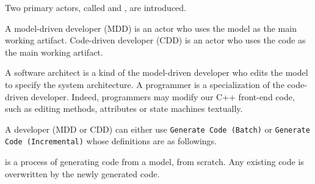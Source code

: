 Two primary actors, called 
and , are introduced.

\begin{definition}
	A model-driven developer (MDD) is an actor who uses the model as the main working artifact. Code-driven developer (CDD) is an actor who uses the code as the main working artifact.
\end{definition}

A software architect is a kind of the model-driven developer
who edits the model to specify the system architecture.
A programmer is a specialization of the code-driven developer.
Indeed, programmers may modify our C++ front-end code, such as editing methods, attributes or state machines textually.



A developer (MDD or CDD) can either use \texttt{Generate Code (Batch)} or \texttt{Generate Code (Incremental)} whose definitions are as followings.

\begin{definition}  \cite{Giese2006} is a process of generating code
	from a model, from scratch.
	Any existing code is overwritten by the newly generated code.
\end{definition}

